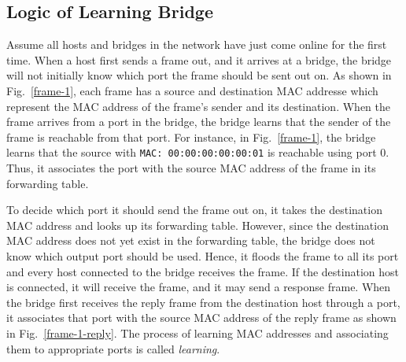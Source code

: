 \documentclass[11pt]{article}
\begin{document}
\subsection{Logic of Learning Bridge}
\label{subsec:logiclearning}
Assume all hosts and bridges in the network have just come online for the first time.
When a host first sends a frame out, and it arrives at a bridge, the bridge will not initially know which port the frame should be sent out on.
As shown in Fig.~\ref{frame-1}, each frame has a source and destination MAC addresse which represent the MAC address of the frame's sender and its destination.
When the frame arrives from a port in the bridge, the bridge learns that the sender of the frame is reachable from that port.
For instance, in Fig.~\ref{frame-1}, the bridge learns that the source with \texttt{MAC: 00:00:00:00:00:01} is reachable using port 0.
Thus, it associates the port with the source MAC address of the frame in its forwarding table.


To decide which port it should send the frame out on, it takes the destination MAC address and looks up its forwarding table.
However, since the destination MAC address does not yet exist in the forwarding table, the bridge does not know which output port should be used.
Hence, it floods the frame to all its port and every host connected to the bridge receives the frame.
If the destination host is connected, it will receive the frame, and it may send a response frame.
When the bridge first receives the reply frame from the destination host through a port, it associates that port with the source MAC address of the reply frame as shown in Fig.~\ref{frame-1-reply}. The process of learning MAC addresses and associating them to appropriate ports is called \textit{learning}.


\end{document}
